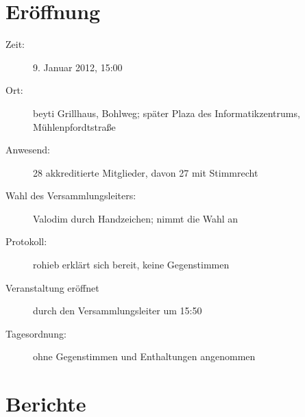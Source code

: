 \documentclass[a4paper,12pt]{scrartcl}
\title{\mytitle}
\date{\mydate}
\begin{document}
\maketitle

\section{Eröffnung}
\begin{description}
  \item[Zeit:] 9. Januar 2012, 15:00
  \item[Ort:] beyti Grillhaus, Bohlweg; später Plaza des Informatikzentrums,
    Mühlenpfordtstraße
  \item[Anwesend:] 28 akkreditierte Mitglieder, davon 27 mit Stimmrecht
  \item[Wahl des Versammlungsleiters:] Valodim durch Handzeichen; nimmt die 
    Wahl an
  \item[Protokoll:] rohieb erklärt sich bereit, keine Gegenstimmen
  \item[Veranstaltung eröffnet] durch den Versammlungsleiter um 15:50
  \item[Tagesordnung:] ohne Gegenstimmen und Enthaltungen angenommen
\end{description}

\section{Berichte}
\end{document}
